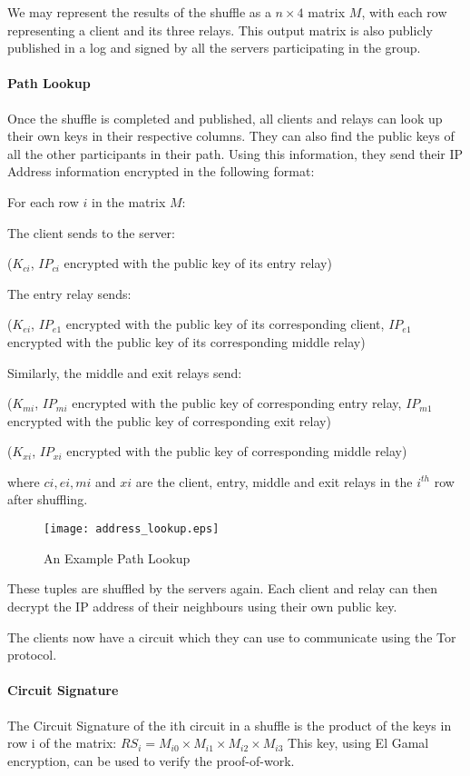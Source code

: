 We may represent the results of the shuffle as a $n \times 4$ matrix $M$, with 
each row representing a client and its three relays. This output matrix is also 
publicly published in a log and signed by all the servers participating in the 
group.

\paragraph{Path Lookup}
Once the shuffle is completed and published, all clients and relays can look up
their own keys in their respective columns. They can also find the public keys 
of all the other participants in their path. Using this information, they send 
their IP Address information encrypted in the following format:

For each row $i$ in the matrix $M$:

The client sends to the server:

($K_{ci}$, {$IP_{ci}$ encrypted with the public key of its entry relay})

The entry relay sends:

($K_{ei}$, {$IP_{e1}$ encrypted with the public key of its corresponding client}, 
{$IP_{e1}$ encrypted with the public key of its corresponding middle relay})

Similarly, the middle and exit relays send:

($K_{mi}$, {$IP_{mi}$ encrypted with the public key of corresponding entry relay}, 
{$IP_{m1}$ encrypted with the public key of corresponding exit relay})

($K_{xi}$, {$IP_{xi}$ encrypted with the public key of corresponding middle relay})

where $ci, ei, mi$ and $xi$ are the client, entry, middle and exit relays in the $i^{th}$
row after shuffling.

\begin{figure}
\centering
\texttt{[image: address\_lookup.eps]}
\caption{An Example Path Lookup}
\end{figure}

These tuples are shuffled by the servers again. Each client and relay can then 
decrypt the IP address of their neighbours using their own public key.

The clients now have a circuit which they can use to communicate using the Tor 
protocol.

\paragraph{Circuit Signature}
The Circuit Signature of the ith circuit in a shuffle is the product of the keys
in row i of the matrix:
$RS_i = M_{i0} \times M_{i1} \times M_{i2} \times M_{i3}$
This key, using El Gamal encryption, can be used to verify the proof-of-work.

